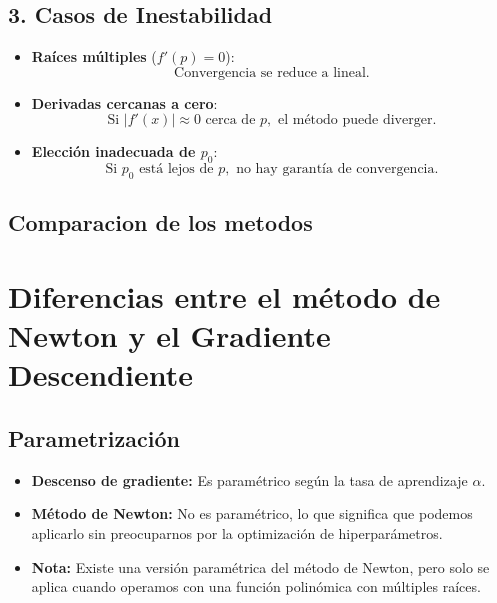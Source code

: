 \documentclass[conference]{IEEEtran}
\begin{document}
\subsection*{3. Casos de Inestabilidad}
\begin{itemize}
    \item \textbf{Raíces múltiples} ($f'(p) = 0$):
    \begin{equation}
        \text{Convergencia se reduce a lineal.}
    \end{equation}
    
    \item \textbf{Derivadas cercanas a cero}:
    \begin{equation}
        \text{Si } |f'(x)| \approx 0 \text{ cerca de } p, \text{ el método puede diverger.}
    \end{equation}
    
    \item \textbf{Elección inadecuada de $p_0$}:
    \begin{equation}
        \text{Si } p_0 \text{ está lejos de } p, \text{ no hay garantía de convergencia.}
    \end{equation}
\end{itemize}

\subsection{Comparacion de los metodos}

\section*{Diferencias entre el método de Newton y el Gradiente Descendiente}

\subsection*{Parametrización}
\begin{itemize}
    \item \textbf{Descenso de gradiente:} Es paramétrico según la tasa de aprendizaje $\alpha$.
    
    \item \textbf{Método de Newton:} No es paramétrico, lo que significa que podemos aplicarlo sin preocuparnos por la optimización de hiperparámetros.
    
    \item \textbf{Nota:} Existe una versión paramétrica del método de Newton, pero solo se aplica cuando operamos con una función polinómica con múltiples raíces.
\end{itemize}
\end{document}
